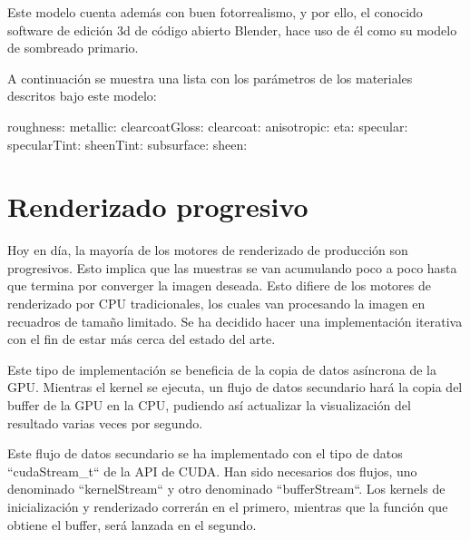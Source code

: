 	Este modelo cuenta además con buen fotorrealismo, y por ello, el conocido software de edición 3d de código abierto Blender, hace uso de él como su modelo de sombreado primario.


	A continuación se muestra una lista con los parámetros de los materiales descritos bajo este modelo:

	roughness:
	metallic:
	clearcoatGloss:
	clearcoat:
	anisotropic:
	eta:
	specular:
	specularTint:
	sheenTint:
	subsurface:
	sheen:


	
	\section{Renderizado progresivo}
		
	Hoy en día, la mayoría de los motores de renderizado de producción son progresivos. Esto implica que las muestras se van acumulando poco a poco hasta que termina por converger la imagen deseada. Esto difiere de los motores de renderizado por CPU tradicionales, los cuales van procesando la imagen en recuadros de tamaño limitado. Se ha decidido hacer una implementación iterativa con el fin de estar más cerca del estado del arte.



	Este tipo de implementación se beneficia de la copia de datos asíncrona de la GPU. Mientras el kernel se ejecuta, un flujo de datos secundario hará la copia del buffer de la GPU en la CPU, pudiendo así actualizar la visualización del resultado varias veces por segundo.

	Este flujo de datos secundario se ha implementado con el tipo de datos ``cudaStream\_t`` de la API de CUDA. Han sido necesarios dos flujos, uno denominado ``kernelStream`` y otro denominado ``bufferStream``. Los kernels de inicialización y renderizado correrán en el primero, mientras que la función que obtiene el buffer, será lanzada en el segundo.
